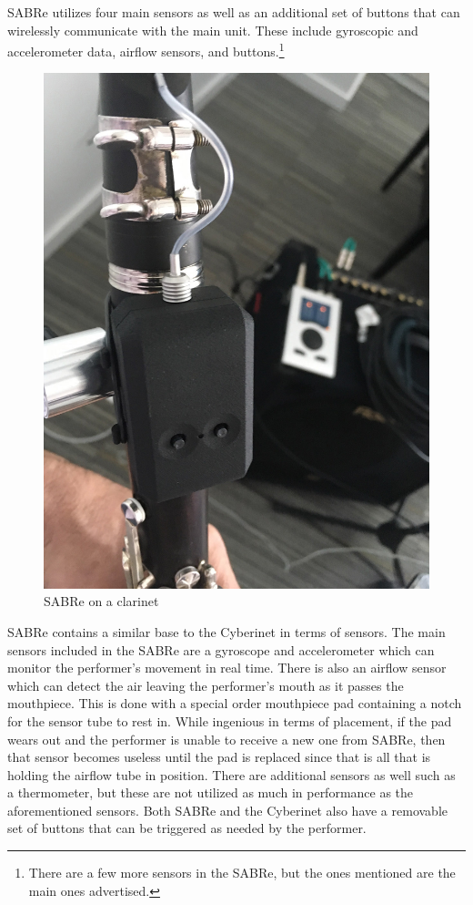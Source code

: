 SABRe utilizes four main sensors as well as an additional set of buttons that can wirelessly communicate with the main unit. These include gyroscopic and accelerometer data, airflow sensors, and buttons.\footnote{There are a few more sensors in the SABRe, but the ones mentioned are the main ones advertised.}

\begin{figure}
    \centering
    \includegraphics[scale=0.2]{diagrams/sabre-right-hand.jpg}
    \caption{SABRe on a clarinet}
    \label{fig:SABRe} %
\end{figure}


SABRe contains a similar base to the Cyberinet in terms of sensors. The main sensors included in the SABRe are a gyroscope and accelerometer which can monitor the performer's movement in real time. There is also an airflow sensor which can detect the air leaving the performer's mouth as it passes the mouthpiece. This is done with a special order mouthpiece pad containing a notch for the sensor tube to rest in. While ingenious in terms of placement, if the pad wears out and the performer is unable to receive a new one from SABRe, then that sensor becomes useless until the pad is replaced since that is all that is holding the airflow tube in position. There are additional sensors as well such as a thermometer, but these are not utilized as much in performance as the aforementioned sensors. Both SABRe and the Cyberinet also have a removable set of buttons that can be triggered as needed by the performer.


